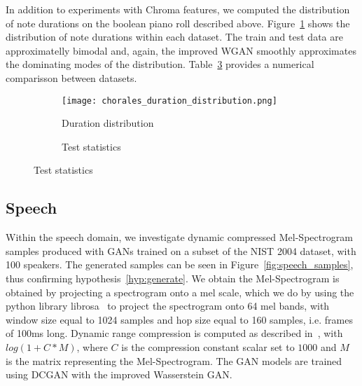In addition to experiments with Chroma features, we computed the distribution of
note durations on the boolean piano roll described above.
Figure~\ref{fig:chorales_duration_distribution} shows the distribution of
note durations within each dataset. The train and test data are approximatelly
bimodal and, again, the improved WGAN smoothly approximates the
dominating modes of the distribution. Table~\ref{tbl:duration} provides a numerical 
comparisson between datasets.


\begin{figure}[!h]
    \begin{subfigure}[b]{0.65\textwidth}
        \texttt{[image: chorales\_duration\_distribution.png]}
        \caption{Duration distribution}
        \label{fig:chorales_duration_distribution}
    \end{subfigure}
    \quad
    \begin{subfigure}[b]{0.3\textwidth}
        \caption{Test statistics}
        \label{tbl:duration}
    \end{subfigure}
\end{figure}

\subsection{Speech}
Within the speech domain, we investigate dynamic compressed Mel-Spectrogram 
samples produced with GANs trained on a subset of the NIST 2004 dataset, with
100 speakers. The generated samples can be seen in
Figure~\ref{fig:speech_samples}, thus confirming hypothesis~\ref{hyp:generate}.
We obtain the Mel-Spectrogram is obtained by projecting a
spectrogram onto a mel scale, which we do by using the python library
librosa~\cite{mcfee2015librosa} to project the spectrogram onto 64 mel bands,
with window size equal to 1024 samples and hop size equal to 160 samples, i.e.
frames of 100ms long. Dynamic range compression is computed as described 
in~\cite{lukic2016speaker}, with $log(1 + C*M)$, where $C$ is the compression 
constant scalar set to $1000$ and $M$ is the matrix representing the Mel-Spectrogram.
The GAN models are trained using DCGAN with the improved Wasserstein GAN.

